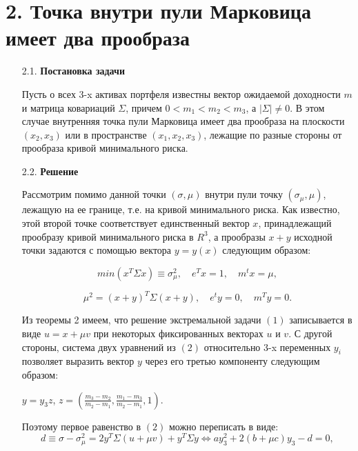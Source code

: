 \documentclass[12pt,a4 paper]{book}
\begin{document}
\section*{2. Точка внутри пули Марковица имеет два прообраза}
\smallskip
\begin{enumerate}
\item[2.1.] \textbf{Постановка задачи}

Пусть о всех 3-x активах портфеля известны вектор ожидаемой доходности $m$ и матрица ковариаций $\Sigma$, причем $0 < m_1 < m_2 < m_3$, а $|\Sigma| \neq 0$. В этом случае внутренняя точка пули Марковица имеет два прообраза на плоскости $(x_2,x_3)$ или в пространстве $(x_1,x_2,x_3)$, лежащие по разные стороны от прообраза кривой минимального риска.

\item[2.2.] \textbf{Решение}
\smallskip

Рассмотрим помимо данной точки $(\sigma, \mu)$ внутри пули точку $(\sigma_\mu, \mu)$, лежащую на ее границе, т.е. на кривой минимального риска. Как известно, этой второй точке соответствует единственный вектор $x$, принадлежащий прообразу кривой минимального риска в $R^3$, а прообразы $x + y$ исходной точки задаются с помощью вектора $y=y(x)$ следующим образом:

\begin{equation}
min(x^T \Sigma x)\equiv \sigma_\mu^2,  \quad e^T x = 1, \quad m^t x = \mu, 
\label{eq:ref}
\end{equation}

\begin{equation}
\mu^2 = (x+y)^T \Sigma (x+y), \quad e^t y = 0 , \quad m^T y = 0.
\label{eq:ref}
\end{equation}

Из теоремы 2 имеем, что решение экстремальной задачи $(1)$ записывается в виде $u=x+\mu v$ при некоторых фиксированных векторах $u$ и $v$. С другой стороны, система двух уравнений из $(2)$ относительно 3-x переменных $y_i$ позволяет выразить вектор $y$ через его третью компоненту следующим образом:

\begin{center}
$y=y_3 z$, \quad $z=(\frac{m_3-m_2}{m_2-m_1}, \frac{m_1-m_3}{m_2-m_1},   1)$.
\end{center}
Поэтому первое равенство в $(2)$ можно переписать в виде:
\begin{equation}
d\equiv \sigma - \sigma_\mu^2 = 2 y^T \Sigma (u+\mu v)+ y^T\Sigma y \Leftrightarrow a y_3^2+2(b+\mu c)y_3-d=0,
\label{eq:ref}
\end{equation}


\end{enumerate}
\end{document}
